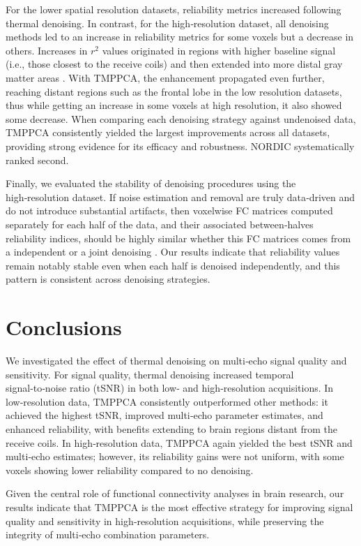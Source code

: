 For the lower spatial resolution datasets, reliability metrics increased following thermal denoising.  In contrast, for the high‑resolution dataset, all denoising methods led to an increase in reliability metrics for some voxels but a decrease in others. Increases in $r^2$ values originated in regions with higher baseline signal (i.e., those closest to the receive coils) and then extended into more distal gray matter areas \citep{wald2017impacting, pohmannSignalnoiseRatioField2024}. With TMPPCA, the enhancement propagated even further, reaching distant regions such as the frontal lobe in the low resolution datasets, thus while getting an increase in some voxels at high resolution, it also showed some decrease. When comparing each denoising strategy against undenoised data, TMPPCA consistently yielded the largest improvements across all datasets, providing strong evidence for its efficacy and robustness. NORDIC systematically ranked second.

Finally, we evaluated the stability of denoising procedures using the high‑resolution dataset. If noise estimation and removal are truly data‑driven and do not introduce substantial artifacts, then voxelwise FC matrices computed separately for each half of the data, and their associated between‑halves reliability indices, should be highly similar whether this FC matrices comes from a independent or a joint denoising \citep{lynchRapidPrecisionFunctional2020}. Our results indicate that reliability values remain notably stable even when each half is denoised independently, and this pattern is consistent across denoising strategies.

\section{Conclusions}

We investigated the effect of thermal denoising on multi‑echo signal quality and sensitivity. For signal quality, thermal denoising increased temporal signal‑to‑noise ratio (tSNR) in both low‑ and high‑resolution acquisitions. In low‑resolution data, TMPPCA consistently outperformed other methods: it achieved the highest tSNR, improved multi‑echo parameter estimates, and enhanced reliability, with benefits extending to brain regions distant from the receive coils. In high‑resolution data, TMPPCA again yielded the best tSNR and multi‑echo estimates; however, its reliability gains were not uniform, with some voxels showing lower reliability compared to no denoising.

Given the central role of functional connectivity analyses in brain research, our results indicate that TMPPCA is the most effective strategy for improving signal quality and sensitivity in high‑resolution acquisitions, while preserving the integrity of multi‑echo combination parameters.

